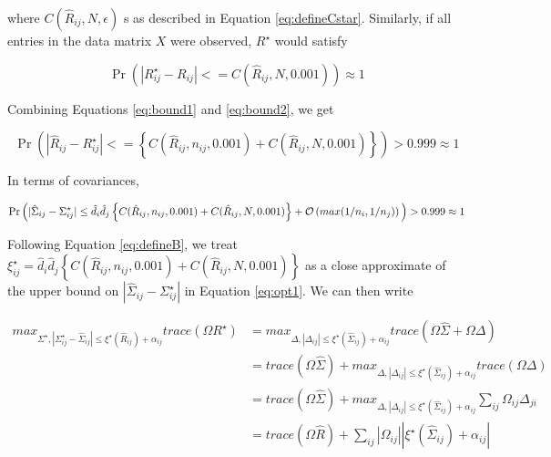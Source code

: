 where $C( \hat{R}_{ij}, N, \epsilon )$ s as described in Equation \ref{eq:defineCstar}. Similarly, if all entries in the data matrix $X$ were observed, $R^{\star}$ would satisfy

\begin{equation}\label{eq:bound2}
\Pr \left ( |{R}^{\star}_{ij} - R_{ij}| <=  C( \hat{R}_{ij}, N, 0.001 ) \right) \approx 1
\end{equation}

Combining Equations \ref{eq:bound1} and \ref{eq:bound2}, we get 

\begin{equation}\label{eq:defineB}
\Pr \left ( |\hat{R}_{ij} - R^{\star}_{ij}| <= \left \{ C( \hat{R}_{ij}, n_{ij}, 0.001 ) + C( \hat{R}_{ij}, N, 0.001 ) \right \} \right) > 0.999 \approx 1
\end{equation}

In terms of covariances,

\begin{equation}\label{eq:defineB}
\Pr \left( |\hat{\Sigma}_{ij} - \Sigma^{\star}_{ij}| \leq \hat{d}_{i} \hat{d}_{j} \left\{ C( \hat{R}_{ij}, n_{ij}, 0.001 ) + C( \hat{R}_{ij}, N, 0.001 ) \right\} + \mathcal{O} \left( max(1/n_i, 1/n_j) \right)\vphantom{\left( \right)} \right) > 0.999 \approx 1
\end{equation}

Following Equation \ref{eq:defineB}, we treat $\xi^{\star}_{ij} =\hat{d}_{i} \hat{d}_{j} \left \{ C( \hat{R}_{ij}, n_{ij}, 0.001 ) + C(\hat{R}_{ij}, N, 0.001) \right \} $ as a close approximate of the  upper bound on $|\hat{\Sigma}_{ij} - \Sigma^{\star}_{ij}|$ in Equation \ref{eq:opt1}.
We can then write 

\begin{equation}
    \begin{aligned}
    max_{\Sigma^{\star}, | \Sigma^{\star}_{ij} - \hat{\Sigma}_{ij}| \leq \xi^{\star}(\hat{R}_{ij}) + \alpha_{ij}} trace \left ( \Omega R^{\star} \right ) & = 
    max_{\Delta, |\Delta_{ij}| \leq \xi^{\star}(\hat{\Sigma}_{ij}) + \alpha_{ij}} trace \left ( \Omega\hat{\Sigma} + \Omega \Delta \right )  \\
    & = trace (\Omega\hat{\Sigma}) + max_{\Delta, |\Delta_{ij}|  \leq  \xi^{\star}(\hat{\Sigma}_{ij}) + \alpha_{ij}} trace \left (\Omega \Delta \right)  \\
    & = trace (\Omega\hat{\Sigma}) + max_{\Delta, |\Delta_{ij}|  \leq  \xi^{\star}(\hat{\Sigma}_{ij}) + \alpha_{ij}} \sum_{ij} \Omega_{ij} \Delta_{ji} \\
    & = trace (\Omega\hat{R}) + \sum_{ij} |\Omega_{ij}| |\xi^{\star}(\hat{\Sigma}_{ij}) + \alpha_{ij}| \\
    \end{aligned}
\end{equation}

